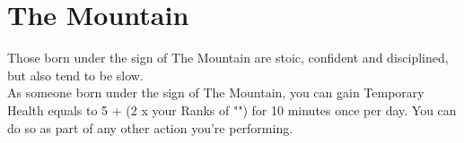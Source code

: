 \section{The Mountain}\label{zodiac:mountain}

Those born under the sign of The Mountain are stoic, confident and disciplined, but also tend to be slow.\\
As someone born under the sign of The Mountain, you can gain Temporary Health equals to 5 + (2 x your Ranks of "") for 10 minutes once per day.
You can do so as part of any other action you're performing.\\
